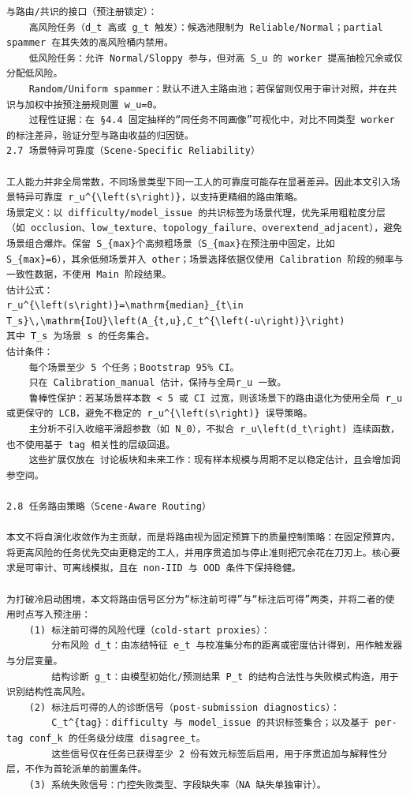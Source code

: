 \documentclass[a4paper,12pt]{article}
\begin{document}
\begin{Verbatim}[fontsize=\small,breaklines=true,breakanywhere=true]
与路由/共识的接口（预注册锁定）：
	高风险任务（d_t 高或 g_t 触发）：候选池限制为 Reliable/Normal；partial spammer 在其失效的高风险桶内禁用。
	低风险任务：允许 Normal/Sloppy 参与，但对高 S_u 的 worker 提高抽检冗余或仅分配低风险。
	Random/Uniform spammer：默认不进入主路由池；若保留则仅用于审计对照，并在共识与加权中按预注册规则置 w_u=0。
	过程性证据：在 §4.4 固定抽样的“同任务不同画像”可视化中，对比不同类型 worker 的标注差异，验证分型与路由收益的归因链。
2.7 场景特异可靠度（Scene-Specific Reliability）

工人能力并非全局常数，不同场景类型下同一工人的可靠度可能存在显著差异。因此本文引入场景特异可靠度 r_u^{\left(s\right)}，以支持更精细的路由策略。
场景定义：以 difficulty/model_issue 的共识标签为场景代理，优先采用粗粒度分层（如 occlusion、low_texture、topology_failure、overextend_adjacent），避免场景组合爆炸。保留 S_{max}个高频粗场景（S_{max}在预注册中固定，比如 S_{max}=6），其余低频场景并入 other；场景选择依据仅使用 Calibration 阶段的频率与一致性数据，不使用 Main 阶段结果。
估计公式：
r_u^{\left(s\right)}=\mathrm{median}_{t\in T_s}\,\mathrm{IoU}\left(A_{t,u},C_t^{\left(-u\right)}\right)
其中 T_s 为场景 s 的任务集合。
估计条件：
	每个场景至少 5 个任务；Bootstrap 95% CI。
	只在 Calibration_manual 估计，保持与全局r_u 一致。
	鲁棒性保护：若某场景样本数 < 5 或 CI 过宽，则该场景下的路由退化为使用全局 r_u 或更保守的 LCB，避免不稳定的 r_u^{\left(s\right)} 误导策略。
	主分析不引入收缩平滑超参数（如 N_0），不拟合 r_u\left(d_t\right) 连续函数，也不使用基于 tag 相关性的层级回退。
	这些扩展仅放在 讨论板块和未来工作：现有样本规模与周期不足以稳定估计，且会增加调参空间。

2.8 任务路由策略（Scene-Aware Routing）

本文不将自演化收敛作为主贡献，而是将路由视为固定预算下的质量控制策略：在固定预算内，将更高风险的任务优先交由更稳定的工人，并用序贯追加与停止准则把冗余花在刀刃上。核心要求是可审计、可离线模拟，且在 non-IID 与 OOD 条件下保持稳健。

为打破冷启动困境，本文将路由信号区分为“标注前可得”与“标注后可得”两类，并将二者的使用时点写入预注册：
	(1) 标注前可得的风险代理（cold-start proxies）：
		分布风险 d_t：由冻结特征 e_t 与校准集分布的距离或密度估计得到，用作触发器与分层变量。
		结构诊断 g_t：由模型初始化/预测结果 P_t 的结构合法性与失败模式构造，用于识别结构性高风险。
	(2) 标注后可得的人的诊断信号（post-submission diagnostics）：
		C_t^{tag}：difficulty 与 model_issue 的共识标签集合；以及基于 per-tag conf_k 的任务级分歧度 disagree_t。
		这些信号仅在任务已获得至少 2 份有效元标签后启用，用于序贯追加与解释性分层，不作为首轮派单的前置条件。
	(3) 系统失败信号：门控失败类型、字段缺失率（NA 缺失单独审计）。


\end{Verbatim}
\end{document}

